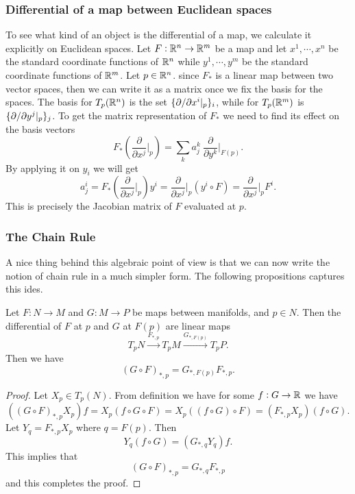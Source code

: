 \subsubsection{Differential of a map between Euclidean spaces}
To see what kind of an object is the differential of a map, we calculate it explicitly on Euclidean spaces. Let $ F:\mathbb{R}^n \to \mathbb{R}^m $ be a map and let $ x^1,\cdots,x^n $ be the standard coordinate functions of $ \mathbb{R}^n $ while $ y^1,\cdots,y^m $ be the standard coordinate functions of $ \mathbb{R}^m $. Let $ p \in \mathbb{R}^n $. since $ F_* $ is a linear map between two vector spaces, then we can write it as a matrix once we fix the basis for the spaces. The basis for $ T_p(\mathbb{R}^n) $ is the set $ \{\partial/\partial x^i|_p\}_{i} $, while for $ T_p(\mathbb{R}^m) $ is $ \{\partial/\partial y^j|_p\}_j $. To get the matrix representation of $ F_* $ we need to find its effect on the basis vectors
\[ F_*(\frac{\partial}{\partial  x^j}\big|_{p}) = \sum_{k} a^k_j\  \frac{\partial}{\partial  y^k}\big|_{F(p)}. \]
By applying it on $ y_i $ we will get
\[ a_j^i = F_*(\frac{\partial}{\partial  x^j}\big|_{p})y^i = \frac{\partial}{\partial  x^j}\big|_{p} (y^i \circ F) =  \frac{\partial}{\partial  x^j}\big|_{p}F^i. \]
This is precisely the Jacobian matrix of $ F $ evaluated at $ p $.

\subsubsection{The Chain Rule}
A nice thing behind this algebraic point of view is that we can now write the notion of chain rule in a much simpler form. The following propositions captures this ides.

\begin{proposition}
	\label{prop:ChainRule}
	Let $ F: N \to M $ and $ G:M\to P $ be maps between manifolds, and $ p \in N $. Then the differential of $ F $ at $ p $ and $ G $ at $ F(p) $ are linear maps
	\[ T_pN \xrightarrow{F_{*,p}} T_pM \xrightarrow{G_{*,F(p)}} T_pP. \]
	Then we have
	\[ (G\circ F)_{*,p} = G_{*,F(p)} F_{*,p}. \]
\end{proposition}
\begin{proof}
	Let $ X_p \in T_p(N) $. From definition we have for some $ f: G \to \mathbb{R} $ we have
	\[ ((G\circ F)_{*,p}X_p)f = X_p(f\circ G\circ F) = X_p ((f\circ G)\circ F) = (F_{*,p}X_p)(f\circ G).\]
	Let $ Y_q = F_{*,p}X_p $ where $ q = F(p) $. Then 
	\[ Y_q (f\circ G) = (G_{*,q}Y_q) f.  \]
	This implies that 
	\[ (G\circ F)_{*,p} = G_{*,q} F_{*,p} \]
	and this completes the proof.
\end{proof}

